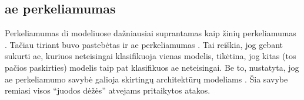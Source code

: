 \subsection{\gls{ae} perkeliamumas}\label{sec:literature:transfer}
Perkeliamumas \gls{di} modeliuose dažniausiai suprantamas kaip žinių perkeliamumas . Tačiau tiriant  buvo pastebėtas ir \gls{ae} perkeliamumas . Tai reiškia, jog gebant sukurti \gls{ae}, kuriuos neteisingai klasifikuoja vienas modelis, tikėtina, jog kitas (tos pačios paskirties) modelis taip pat klasifikuos \gls{ae} neteisingai. Be to, nustatyta, jog \gls{ae} perkeliamumo savybė galioja skirtingų architektūrų modeliams \cite{demetrioAdversarialEXEmplesSurvey2021}. Šia savybe remiasi visos \enquote{juodos dėžės} atvejams pritaikytos atakos.